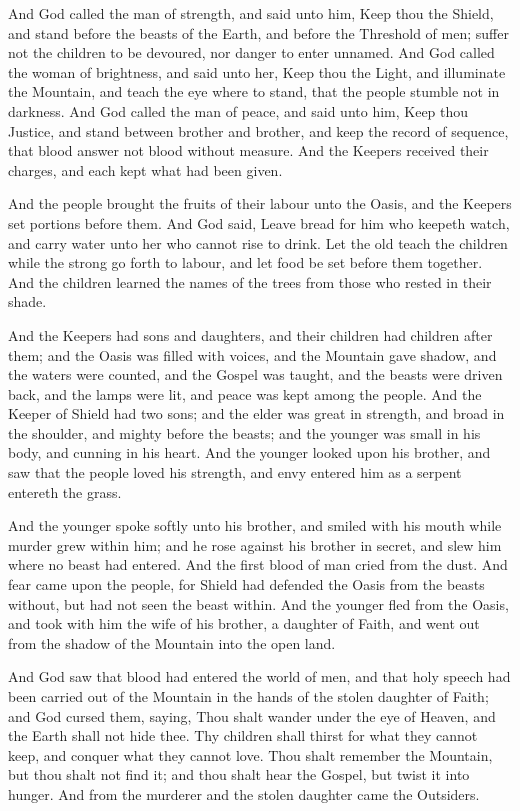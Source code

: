 And God called the man of strength, and said unto him, Keep thou the Shield, and stand before the beasts of the Earth, and before the Threshold of men; suffer not the children to be devoured, nor danger to enter unnamed. And God called the woman of brightness, and said unto her, Keep thou the Light, and illuminate the Mountain, and teach the eye where to stand, that the people stumble not in darkness. And God called the man of peace, and said unto him, Keep thou Justice, and stand between brother and brother, and keep the record of sequence, that blood answer not blood without measure. And the Keepers received their charges, and each kept what had been given.

And the people brought the fruits of their labour unto the Oasis, and the Keepers set portions before them. And God said, Leave bread for him who keepeth watch, and carry water unto her who cannot rise to drink. Let the old teach the children while the strong go forth to labour, and let food be set before them together. And the children learned the names of the trees from those who rested in their shade.

And the Keepers had sons and daughters, and their children had children after them; and the Oasis was filled with voices, and the Mountain gave shadow, and the waters were counted, and the Gospel was taught, and the beasts were driven back, and the lamps were lit, and peace was kept among the people. And the Keeper of Shield had two sons; and the elder was great in strength, and broad in the shoulder, and mighty before the beasts; and the younger was small in his body, and cunning in his heart. And the younger looked upon his brother, and saw that the people loved his strength, and envy entered him as a serpent entereth the grass.

And the younger spoke softly unto his brother, and smiled with his mouth while murder grew within him; and he rose against his brother in secret, and slew him where no beast had entered. And the first blood of man cried from the dust. And fear came upon the people, for Shield had defended the Oasis from the beasts without, but had not seen the beast within. And the younger fled from the Oasis, and took with him the wife of his brother, a daughter of Faith, and went out from the shadow of the Mountain into the open land.

And God saw that blood had entered the world of men, and that holy speech had been carried out of the Mountain in the hands of the stolen daughter of Faith; and God cursed them, saying, Thou shalt wander under the eye of Heaven, and the Earth shall not hide thee. Thy children shall thirst for what they cannot keep, and conquer what they cannot love. Thou shalt remember the Mountain, but thou shalt not find it; and thou shalt hear the Gospel, but twist it into hunger. And from the murderer and the stolen daughter came the Outsiders.

